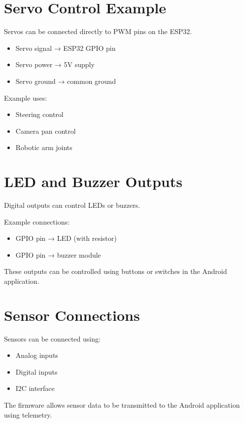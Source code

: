 \section{Servo Control Example}

Servos can be connected directly to PWM pins on the ESP32.

\begin{itemize}
	\item Servo signal → ESP32 GPIO pin
	\item Servo power → 5V supply
	\item Servo ground → common ground
\end{itemize}

Example uses:

\begin{itemize}
	\item Steering control
	\item Camera pan control
	\item Robotic arm joints
\end{itemize}

\section{LED and Buzzer Outputs}

Digital outputs can control LEDs or buzzers.

Example connections:

\begin{itemize}
	\item GPIO pin → LED (with resistor)
	\item GPIO pin → buzzer module
\end{itemize}

These outputs can be controlled using buttons or switches in the Android application.

\section{Sensor Connections}

Sensors can be connected using:

\begin{itemize}
	\item Analog inputs
	\item Digital inputs
	\item I2C interface
\end{itemize}

The firmware allows sensor data to be transmitted to the Android application using telemetry.